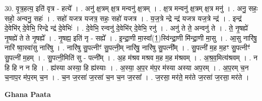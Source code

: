 \documentclass[17pt]{extarticle}
\begin{document}
30. वृ॒त्र॒हत्य॒ इति॑ वृत्र - हत्ये᳚ । . अनु॑ क्ष॒त्रम् क्ष॒त्र मन्वनु॑ क्ष॒त्रम् । . क्ष॒त्र मन्वनु॑ क्ष॒त्रम् क्ष॒त्र मनु॑ । . अनु॒ सहः॒ सहो॒ अन्वनु॒ सहः॑ । . सहो॑ यजत्र यजत्र॒ सहः॒ सहो॑ यजत्र । . य॒ज॒त्रे न्द्रे न्द्र॑ यजत्र यज॒त्रे न्द्र॑ । . इन्द्र॑ दे॒वेभि॑र् दे॒वेभि॒ रिन्द्रे न्द्र॑ दे॒वेभिः॑ । . दे॒वेभि॒ रन्वनु॑ दे॒वेभि॑र् दे॒वेभि॒ रनु॑ । . अनु॑ ते ते॒ अन्वनु॑ ते । . ते॒ नृ॒षह्ये॑ नृ॒षह्ये॑ ते ते नृ॒षह्ये᳚ । . नृ॒षह्य॒ इति॑ नृ - सह्ये᳚ । . इ॒न्द्रा॒णी मा॒स्वा᳚(1॒)स्वि॑न्द्रा॒णी मि॑न्द्रा॒णी मा॒सु । . आ॒सु नारि॑षु॒ नारि॑ ष्वा॒स्वा॑सु नारि॑षु । . नारि॑षु सु॒पत्नीꣳ॑ सु॒पत्नी॒म् नारि॑षु॒ नारि॑षु सु॒पत्नी᳚म् । . सु॒पत्नी॑ म॒ह म॒हꣳ सु॒पत्नीꣳ॑ सु॒पत्नी॑ म॒हम् । . सु॒पत्नी॒मिति॑ सु - पत्नी᳚म् । . अ॒ह म॑श्रव मश्रव म॒ह म॒ह म॑श्रवम् । . अ॒श्र॒व॒मित्य॑श्रवम् । . न हि हि न न हि । . ह्य॑स्या अस्या॒ हि ह्य॑स्याः । . अ॒स्या॒ अ॒प॒र म॑प॒र म॑स्या अस्या अप॒रम् । . अ॒प॒रम् च॒न च॒नाप॒र म॑प॒रम् च॒न । . च॒न ज॒रसा॑ ज॒रसा॑ च॒न च॒न ज॒रसा᳚ । . ज॒रसा॒ मर॑ते॒ मर॑ते ज॒रसा॑ ज॒रसा॒ मर॑ते । \newline

\textbf{Ghana Paata } \newline
\end{document}
